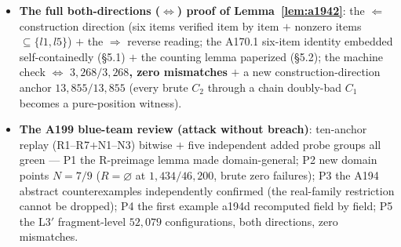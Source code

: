 \begin{itemize}
fully brute-solvable with zero failures ($N=6/8/10$ full volume, no
sampling; $N=6/8$ simultaneously fill the A194 M10 inline-item gap); (3)
the failure taxonomy is promoted to identity level (unsolvable $\Rightarrow
R\ne\varnothing\Rightarrow\neg$offheads; ``$478/478$ offheads$=$False'' is
promoted from spot-check to necessity).
\item \textbf{The full both-directions ($\iff$) proof of
Lemma~\ref{lem:a1942}}: the $\Leftarrow$ construction direction (six items
verified item by item $+$ nonzero items
$\subseteq\{l1,l5\}$) $+$ the $\Rightarrow$ reverse reading; the A170.1
six-item identity embedded self-containedly (\S5.1) $+$ the counting lemma
paperized (\S5.2); the machine check $\iff$ \textbf{$3{,}268/3{,}268$, zero
mismatches} $+$ a new construction-direction anchor \textbf{$13{,}855/
13{,}855$} (every brute $C_2$ through a chain doubly-bad $C_1$ becomes a
pure-position witness).
\item \textbf{The A199 blue-team review (attack without breach)}: ten-anchor
replay (R1--R7$+$N1--N3) bitwise $+$ five independent added probe groups all
green --- P1 the R-preimage lemma made domain-general; P2 new domain points
$N=7/9$ ($R=\varnothing$ at $1{,}434/46{,}200$, brute zero failures); P3
the A194 abstract counterexamples independently confirmed (the real-family
restriction cannot be dropped); P4 the first example a194d recomputed field
by field; P5 the L3$'$ fragment-level $52{,}079$ configurations, both
directions, zero mismatches.
\end{itemize}

